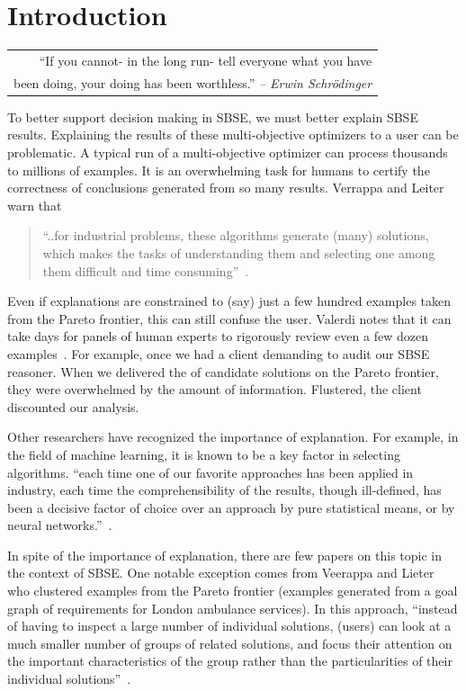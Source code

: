 \documentclass[runningheads]{llncs}
\makeatletter
\newenvironment{myepigraph}
  {\par\hfill\itshape
   \begin{tabular}{@{}r@{}}} %
  {\end{tabular}\par\medskip}
\makeatother
\begin{document}
\section{Introduction}

\begin{myepigraph}
``If you cannot- in the long run- tell  everyone what you have\\
been doing, your  doing has been worthless.'' {\em-- Erwin Schr\"odinger}
\end{myepigraph}
\noindent
To better support decision making in SBSE, we must better explain
SBSE results.
Explaining the results of these
multi-objective optimizers to a user
can be problematic.
A typical run of a multi-objective optimizer
can process thousands to millions of examples.
It is an overwhelming task for humans to
certify the correctness of conclusions generated
from so many results. Verrappa and Leiter warn that
\begin{quote}
``..for industrial problems, these algorithms generate
(many) solutions, which makes the tasks of
understanding them and selecting one among them
difficult and time consuming''~\cite{veerappa11}.
\end{quote}
Even if explanations are constrained to
 (say) just a few hundred examples taken from the Pareto
frontier, this can still confuse the user.
 Valerdi notes that it can take days for
panels of human experts to rigorously review even a few dozen
examples~\cite{valerdi11}.  
For example, once we had a 
client 
demanding to  audit our SBSE reasoner.
 When we delivered the 
of candidate solutions on the Pareto frontier,
they were overwhelmed by
the amount of information.  Flustered,
the client discounted our  analysis.


Other researchers have recognized the importance
of explanation.
For example, in the field of machine learning,
it is known to be a key factor in selecting algorithms.
``each time one of our favorite 
approaches has been applied in industry, each time the
comprehensibility of the results, though ill-defined, has
been a decisive factor of choice over an approach by pure
statistical means, or by neural networks.''~\cite{ag98}.

In spite of the importance of explanation,
there are few papers on this topic in the context of
SBSE.
One notable exception comes from
 Veerappa and Lieter~\cite{veerappa11} who
clustered examples from the Pareto
frontier (examples generated from a goal graph of requirements
for London ambulance services). In this approach,
``instead of having to inspect a large
number of individual solutions, (users) can look at a
much smaller number of groups of related solutions,
and focus their attention on the important
characteristics of the group rather than the
particularities of their individual solutions''~\cite{veerappa11}. 
\end{document}
